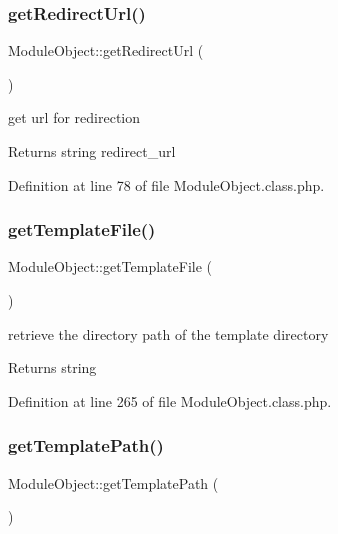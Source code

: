 \mbox{\label{classModuleObject_ae7c0b4d36f7ef9e8b3ec59a6a9bf6116}} 
\subsubsection{\texorpdfstring{get\+Redirect\+Url()}{getRedirectUrl()}}
{\footnotesize\ttfamily Module\+Object\+::get\+Redirect\+Url (\begin{DoxyParamCaption}{ }\end{DoxyParamCaption})}

get url for redirection \begin{DoxyReturn}{Returns}
string redirect\+\_\+url 
\end{DoxyReturn}


Definition at line 78 of file Module\+Object.\+class.\+php.

\mbox{\label{classModuleObject_af5456f80bf7bd5d3c20dd6547423a419}} 
\subsubsection{\texorpdfstring{get\+Template\+File()}{getTemplateFile()}}
{\footnotesize\ttfamily Module\+Object\+::get\+Template\+File (\begin{DoxyParamCaption}{ }\end{DoxyParamCaption})}

retrieve the directory path of the template directory \begin{DoxyReturn}{Returns}
string 
\end{DoxyReturn}


Definition at line 265 of file Module\+Object.\+class.\+php.

\mbox{\label{classModuleObject_a10f29d4a49d7e24bdab4e348633c6609}} 
\subsubsection{\texorpdfstring{get\+Template\+Path()}{getTemplatePath()}}
{\footnotesize\ttfamily Module\+Object\+::get\+Template\+Path (\begin{DoxyParamCaption}{ }\end{DoxyParamCaption})}

